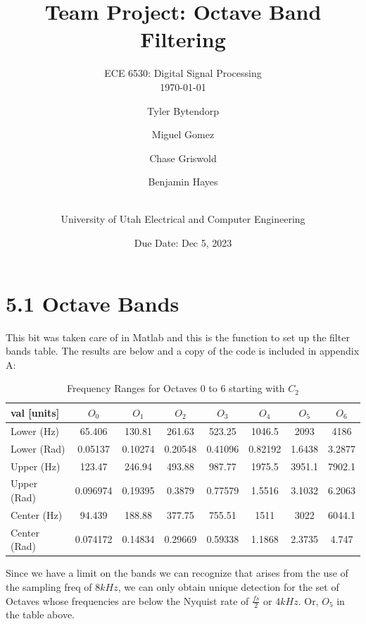 \documentclass[a4paper, 11pt]{exam}
\title{Team Project: Octave Band Filtering}
\subtitle{ECE 6530: Digital Signal Processing \\
\today\\}
\author{ Tyler Bytendorp \and Miguel Gomez \and Chase Griswold \and Benjamin Hayes \and\\
University of Utah Electrical and Computer Engineering}
\date{Due Date: Dec 5, 2023}
\begin{document}
\maketitle
\noindent

\section*{5.1 Octave Bands}
This bit was taken care of in Matlab and this is the function to set up the filter bands table. The results are below and a copy of the code is included in appendix A:
\begin{table}[!ht]
\centering
\begin{tabular}{|l|c|c|c|c|c|c|c|}
\hline
val [units]   & $O_0$ & $O_1$ & $O_2$ & $O_3$ & $O_4$ & $O_5$ & $O_6$ \\
\hline
Lower (Hz)   & 65.406   & 130.81   & 261.63   & 523.25   & 1046.5   & 2093     & 4186    \\
\hline
Lower (Rad)  & 0.05137  & 0.10274  & 0.20548  & 0.41096  & 0.82192  & 1.6438   & 3.2877  \\
\hline
Upper (Hz)   & 123.47   & 246.94   & 493.88   & 987.77   & 1975.5   & 3951.1   & 7902.1  \\
\hline
Upper (Rad)  & 0.096974 & 0.19395  & 0.3879   & 0.77579  & 1.5516   & 3.1032   & 6.2063  \\
\hline
Center (Hz)  & 94.439   & 188.88   & 377.75   & 755.51   & 1511     & 3022     & 6044.1  \\
\hline
Center (Rad) & 0.074172 & 0.14834  & 0.29669  & 0.59338  & 1.1868   & 2.3735   & 4.747   \\
\hline
\end{tabular}
\caption{Frequency Ranges for Octaves 0 to 6 starting with $C_2$}
\end{table}
Since we have a limit on the bands we can recognize that arises from the use of the sampling freq of $8kHz$, we can only obtain unique detection for the set of Octaves whose frequencies are below the Nyquist rate of $\frac{fs}{2}$ or $4kHz$. Or, $O_5$ in the table above.
\end{document}
